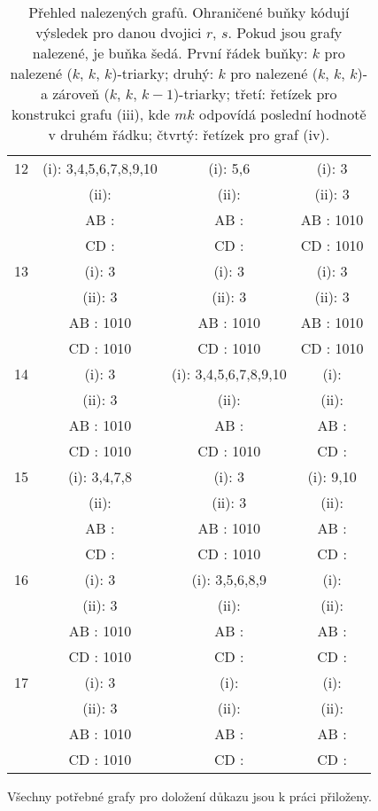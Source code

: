 \begin{table}[h]
{\begin{tabular}{| c || c | c | c |}
12 & (i): 3,4,5,6,7,8,9,10 & (i): 5,6 & \cellcolor{lightgray}(i): 3\\
 & (ii):  & (ii):  & \cellcolor{lightgray}(ii): 3\\
 & AB :  & AB :  & \cellcolor{lightgray}AB : 1010\\
 & CD :  & CD :  & \cellcolor{lightgray}CD : 1010\\\hline

13 & \cellcolor{lightgray}(i): 3 & \cellcolor{lightgray}(i): 3 & \cellcolor{lightgray}(i): 3\\
 & \cellcolor{lightgray}(ii): 3 & \cellcolor{lightgray}(ii): 3 & \cellcolor{lightgray}(ii): 3\\
 & \cellcolor{lightgray}AB : 1010 & \cellcolor{lightgray}AB : 1010 & \cellcolor{lightgray}AB : 1010\\
 & \cellcolor{lightgray}CD : 1010 & \cellcolor{lightgray}CD : 1010 & \cellcolor{lightgray}CD : 1010\\\hline

14 & \cellcolor{lightgray}(i): 3 & (i): 3,4,5,6,7,8,9,10 & (i): \\
 & \cellcolor{lightgray}(ii): 3 & (ii):  & (ii): \\
 & \cellcolor{lightgray}AB : 1010 & AB :  & AB : \\
 & \cellcolor{lightgray}CD : 1010 & CD : 1010 & CD : \\\hline

15 & (i): 3,4,7,8 & \cellcolor{lightgray}(i): 3 & (i): 9,10\\
 & (ii):  & \cellcolor{lightgray}(ii): 3 & (ii): \\
 & AB :  & \cellcolor{lightgray}AB : 1010 & AB : \\
 & CD :  & \cellcolor{lightgray}CD : 1010 & CD : \\\hline

16 & \cellcolor{lightgray}(i): 3 & (i): 3,5,6,8,9 & (i): \\
 & \cellcolor{lightgray}(ii): 3 & (ii):  & (ii): \\
 & \cellcolor{lightgray}AB : 1010 & AB :  & AB : \\
 & \cellcolor{lightgray}CD : 1010 & CD :  & CD : \\\hline

17 & \cellcolor{lightgray}(i): 3 & (i):  & (i): \\
 & \cellcolor{lightgray}(ii): 3 & (ii):  & (ii): \\
 & \cellcolor{lightgray}AB : 1010 & AB :  & AB : \\
 & \cellcolor{lightgray}CD : 1010 & CD :  & CD : \\\hline

\end{tabular}}
\caption{Přehled nalezených grafů. Ohraničené buňky kódují výsledek pro danou dvojici $r$, $s$. Pokud jsou grafy nalezené, je buňka šedá. První řádek buňky: $k$ pro nalezené ($k$, $k$, $k$)-triarky; druhý: $k$ pro nalezené ($k$, $k$, $k$)- a zároveň ($k$, $k$, $k-1$)-triarky; třetí: řetízek pro konstrukci grafu (iii), kde $mk$ odpovídá poslední hodnotě v druhém řádku; čtvrtý: řetízek pro graf (iv).}
\label{obr03:tabvysledkycele}
\end{table}

Všechny potřebné grafy pro doložení důkazu jsou k práci přiloženy.